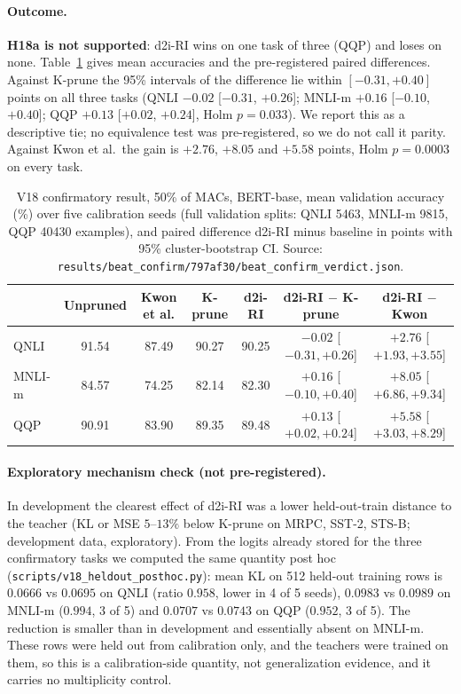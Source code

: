 \documentclass[11pt]{article}
\begin{document}
\paragraph{Outcome.} \textbf{H18a is not supported}: d2i-RI wins on one task of three (QQP) and loses on none.
Table~\ref{tab:v18} gives mean accuracies and the pre-registered paired differences. Against K-prune the 95\% intervals of the difference lie within $[-0.31,+0.40]$ points on all three tasks (QNLI $-0.02$ [$-0.31$, $+0.26$];
MNLI-m $+0.16$ [$-0.10$, $+0.40$]; QQP $+0.13$ [$+0.02$, $+0.24$], Holm $p=0.033$). We report this as a descriptive tie; no equivalence test was pre-registered, so we do not call it parity.
Against Kwon et al.\ the gain is $+2.76$, $+8.05$ and $+5.58$ points, Holm $p=0.0003$ on every task.
\begin{table}[t]\centering\small
\caption{V18 confirmatory result, 50\% of MACs, BERT-base, mean validation accuracy (\%) over five calibration seeds (full validation splits: QNLI 5463, MNLI-m 9815, QQP 40430 examples), and paired
difference d2i-RI minus baseline in points with 95\% cluster-bootstrap CI. Source: \texttt{results/beat\_confirm/797af30/beat\_confirm\_verdict.json}.}\label{tab:v18}
\begin{tabular}{lcccccc}\toprule
 & Unpruned & Kwon et al. & K-prune & d2i-RI & d2i-RI $-$ K-prune & d2i-RI $-$ Kwon\\\midrule
QNLI & 91.54 & 87.49 & 90.27 & 90.25 & $-0.02$ [$-0.31,+0.26$] & $+2.76$ [$+1.93,+3.55$]\\
MNLI-m & 84.57 & 74.25 & 82.14 & 82.30 & $+0.16$ [$-0.10,+0.40$] & $+8.05$ [$+6.86,+9.34$]\\
QQP & 90.91 & 83.90 & 89.35 & 89.48 & $+0.13$ [$+0.02,+0.24$] & $+5.58$ [$+3.03,+8.29$]\\\bottomrule
\end{tabular}\end{table}
\paragraph{Exploratory mechanism check (not pre-registered).} In development the clearest effect of d2i-RI was a lower held-out-train distance to the teacher (KL or MSE $5$--$13\%$ below K-prune on MRPC, SST-2, STS-B; development data, exploratory).
From the logits already stored for the three confirmatory tasks we computed the same quantity post hoc (\texttt{scripts/v18\_heldout\_posthoc.py}): mean KL on 512 held-out training rows is $0.0666$ vs $0.0695$ on QNLI (ratio $0.958$, lower in 4 of 5 seeds),
$0.0983$ vs $0.0989$ on MNLI-m ($0.994$, 3 of 5) and $0.0707$ vs $0.0743$ on QQP ($0.952$, 3 of 5). The reduction is smaller than in development and essentially absent on MNLI-m. These rows were held out from calibration only, and the teachers were trained on them, so this is a
calibration-side quantity, not generalization evidence, and it carries no multiplicity control.
\end{document}
